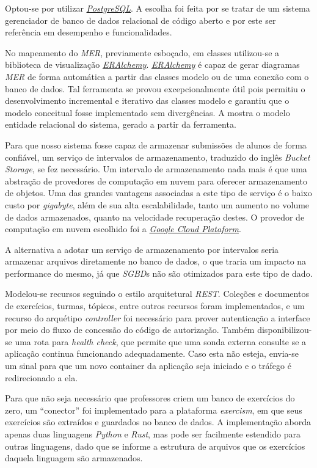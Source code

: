 Optou-se por utilizar \hyperref[link:postgresql]{\emph{PostgreSQL}}.
A escolha foi feita por se tratar de um sistema 
gerenciador de banco de dados relacional de código aberto e por este ser referência em 
desempenho e funcionalidades.

No mapeamento do \emph{MER}, previamente esboçado, em classes utilizou-se a biblioteca 
de visualização \hyperref[link:eralchemy]{\emph{ERAlchemy}}. \hyperref[link:eralchemy]{\emph{ERAlchemy}} é capaz de gerar 
diagramas \emph{MER} de forma automática a partir das classes modelo ou de uma conexão com o banco de dados. 
Tal ferramenta se provou excepcionalmente útil pois permitiu o desenvolvimento incremental e iterativo das 
classes modelo e garantiu que o modelo conceitual fosse implementado sem divergências. A  mostra 
o modelo entidade relacional do sistema, gerado a partir da ferramenta.

Para que nosso sistema fosse capaz de armazenar submissões de alunos de forma confiável,  
um serviço de intervalos de  armazenamento, traduzido do inglês \emph{Bucket Storage}, se 
fez necessário. Um intervalo de armazenamento nada mais é que uma abstração de provedores 
de computação em nuvem para oferecer armazenamento de objetos. Uma das grandes vantagens associadas 
a este tipo de serviço é o baixo custo por \emph{gigabyte}, além de sua alta escalabilidade, tanto 
 um aumento no volume de dados armazenados, quanto na velocidade recuperação destes.
O provedor de computação em nuvem escolhido foi a \hyperref[link:gcp]{\emph{Google Cloud Plataform}}.


A alternativa a adotar um serviço de armazenamento por intervalos seria armazenar arquivos 
diretamente no banco de dados, o que traria um impacto na performance do mesmo, já que \emph{SGBD}s não são otimizados para
este tipo de dado. 

Modelou-se recursos seguindo o estilo arquitetural \emph{REST}. Coleções e documentos
de exercícios, turmas, tópicos, entre outros recursos foram implementados, e um 
recurso do arquétipo \emph{controller} foi necessário para prover autenticação a interface por 
meio do fluxo de concessão do código de autorização. Também disponibilizou-se uma rota para \emph{health check}, 
que permite que uma sonda externa consulte se a aplicação continua funcionando adequadamente. Caso esta não esteja, 
envia-se um sinal para que um novo container da aplicação seja iniciado e o tráfego é redirecionado a ela. 

Para que não seja necessário que professores criem um banco de exercícios do zero, um ``conector'' foi 
implementado para a plataforma \emph{exercism}, em que seus exercícios são extraídos e guardados no banco 
de dados. A implementação aborda apenas duas linguagens \emph{Python} e \emph{Rust}, mas 
pode ser facilmente estendido para outras linguagens, dado que se informe a estrutura de arquivos 
que os exercícios daquela linguagem são armazenados.

